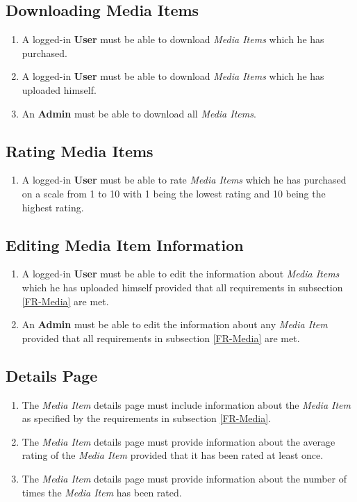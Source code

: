 \subsection {Downloading Media Items}

\begin{enumerate}[label=FR-\twodigits*, resume]
	\item A logged-in \textbf{User} must be able to download \textit{Media Items} which he has purchased.
	\item A logged-in \textbf{User} must be able to download \textit{Media Items} which he has uploaded himself.
	\item An \textbf{Admin} must be able to download all \textit{Media Items}.
\end{enumerate}
		
\subsection {Rating Media Items} \label{FR-RatingMedia}

\begin{enumerate}[label=FR-\twodigits*, resume]
	\item A logged-in \textbf{User} must be able to rate \textit{Media Items} which he has purchased on a scale from 1 to 10 with 1 being the lowest rating and 10 being the highest rating.
\end{enumerate}

\subsection{Editing Media Item Information}

\begin{enumerate}[label=FR-\twodigits*, resume]
	\item A logged-in \textbf{User} must be able to edit the information about \textit{Media Items} which he has uploaded himself provided that all requirements in subsection \ref{FR-Media} are met.
	\item An \textbf{Admin} must be able to edit the information about any \textit{Media Item} provided that all requirements in subsection \ref{FR-Media} are met.
\end{enumerate}
			
\subsection {Details Page}

\begin{enumerate}[label=FR-\twodigits*, resume]
	\item The \textit{Media Item} details page must include information about the \textit{Media Item} as specified by the requirements in subsection \ref{FR-Media}.
	\item The \textit{Media Item} details page must provide information about the average rating of the \textit{Media Item} provided that it has been rated at least once.
	\item The \textit{Media Item} details page must provide information about the number of times the \textit{Media Item} has been rated.
\end{enumerate}
			
%
